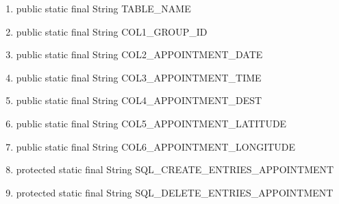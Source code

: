 \begin{enumerate}
	\item public static final String TABLE_NAME
	\item public static final String COL1_GROUP_ID
	\item public static final String COL2_APPOINTMENT_DATE
	\item public static final String COL3_APPOINTMENT_TIME
	\item public static final String COL4_APPOINTMENT_DEST
	\item public static final String COL5_APPOINTMENT_LATITUDE
	\item public static final String COL6_APPOINTMENT_LONGITUDE
	\item protected static final String SQL_CREATE_ENTRIES_APPOINTMENT
	\item protected static final String SQL_DELETE_ENTRIES_APPOINTMENT
\end{enumerate}

